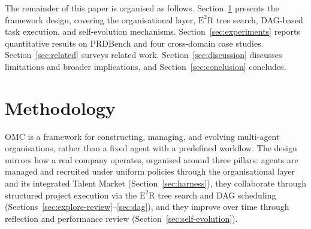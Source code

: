 \documentclass[11pt,a4paper]{article}
\begin{document}
The remainder of this paper is organised as follows.  Section~\ref{sec:methodology} presents the framework design, covering the organisational layer, $\text{E}^2$R tree search, DAG-based task execution, and self-evolution mechanisms.  Section~\ref{sec:experiments} reports quantitative results on PRDBench and four cross-domain case studies.  Section~\ref{sec:related} surveys related work.  Section~\ref{sec:discussion} discusses limitations and broader implications, and Section~\ref{sec:conclusion} concludes.


\section{Methodology}
\label{sec:methodology}

OMC is a framework for constructing, managing, and evolving multi-agent organisations, rather than a fixed agent with a predefined workflow.  The design mirrors how a real company operates, organised around three pillars: agents are managed and recruited under uniform policies through the organisational layer and its integrated Talent Market (Section~\ref{sec:harness}), they collaborate through structured project execution via the $\text{E}^2$R tree search and DAG scheduling (Sections~\ref{sec:explore-review}--\ref{sec:dag}), and they improve over time through reflection and performance review (Section~\ref{sec:self-evolution}).
\end{document}
